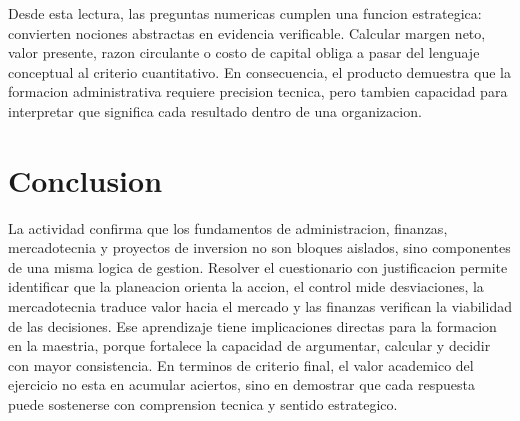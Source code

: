 \documentclass[
	spanish,
	letterpaper, oneside
]{article}
\begin{document}
Desde esta lectura, las preguntas numericas cumplen una funcion estrategica: convierten nociones abstractas en evidencia verificable. Calcular margen neto, valor presente, razon circulante o costo de capital obliga a pasar del lenguaje conceptual al criterio cuantitativo. En consecuencia, el producto demuestra que la formacion administrativa requiere precision tecnica, pero tambien capacidad para interpretar que significa cada resultado dentro de una organizacion.

\section{Conclusion}

La actividad confirma que los fundamentos de administracion, finanzas, mercadotecnia y proyectos de inversion no son bloques aislados, sino componentes de una misma logica de gestion. Resolver el cuestionario con justificacion permite identificar que la planeacion orienta la accion, el control mide desviaciones, la mercadotecnia traduce valor hacia el mercado y las finanzas verifican la viabilidad de las decisiones. Ese aprendizaje tiene implicaciones directas para la formacion en la maestria, porque fortalece la capacidad de argumentar, calcular y decidir con mayor consistencia. En terminos de criterio final, el valor academico del ejercicio no esta en acumular aciertos, sino en demostrar que cada respuesta puede sostenerse con comprension tecnica y sentido estrategico.

\clearpage
\nocite{itescaSitioWeb,itescaMGAOferta}

\end{document}
